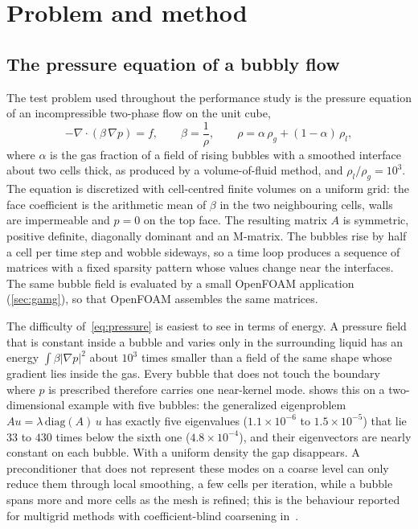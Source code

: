 \documentclass[11pt,a4paper]{article}
\begin{document}
\section{Problem and method}\label{sec:method}

\subsection{The pressure equation of a bubbly flow}\label{sec:problem}

The test problem used throughout the performance study is the pressure equation of an incompressible
two-phase flow on the unit cube,
\begin{equation}\label{eq:pressure}
  -\nabla\cdot\left(\beta\,\nabla p\right) = f, \qquad \beta = \frac{1}{\rho},
  \qquad \rho = \alpha\,\rho_g + (1-\alpha)\,\rho_l ,
\end{equation}
where $\alpha$ is the gas fraction of a field of rising bubbles with a smoothed interface about two cells
thick, as produced by a volume-of-fluid method, and $\rho_l/\rho_g = 10^3$. The equation is discretized 
with cell-centred finite volumes on a uniform grid: the face coefficient is the arithmetic mean of $\beta$ 
in the two neighbouring cells, walls are impermeable and $p=0$ on the top face. The resulting matrix $A$ 
is symmetric, positive definite, diagonally dominant and an M-matrix. The bubbles rise by half a cell per 
time step and wobble sideways, so a time loop produces a sequence of matrices with a fixed sparsity pattern 
whose values change near the interfaces. The same bubble field is evaluated by a small OpenFOAM application 
(\cref{sec:gamg}), so that OpenFOAM assembles the same matrices.

The difficulty of~\eqref{eq:pressure} is easiest to see in terms of energy. A pressure field that is
constant inside a bubble and varies only in the surrounding liquid has an energy
$\int\beta|\nabla p|^2$ about $10^3$ times smaller than a field of the same shape whose gradient lies 
inside the gas. Every bubble that does not touch the boundary where $p$ is prescribed therefore carries 
one near-kernel mode.  shows this on a two-dimensional example with five bubbles: the
generalized eigenproblem $Au = \lambda\,\mathrm{diag}(A)\,u$ has exactly five eigenvalues
($1.1\times10^{-6}$ to $1.5\times10^{-5}$) that lie $33$ to $430$ times below the sixth one 
($4.8\times10^{-4}$), and their eigenvectors are nearly constant on each bubble. With a uniform density the 
gap disappears. A preconditioner that does not represent these modes on a coarse level can only reduce them 
through local smoothing, a few cells per iteration, while a bubble spans more and more cells as the mesh is 
refined; this is the behaviour reported for multigrid methods with coefficient-blind coarsening 
in~\cite{MacLachlan2008}.
\end{document}

